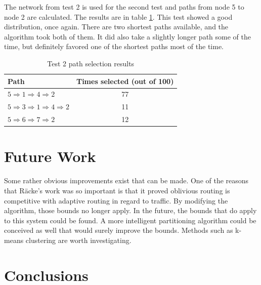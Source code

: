 The network from test 2 is used for the second test and paths from node 5 to node 2 are calculated. The results are in table \ref{tab:routing:test_2_paths}. This test showed a good distribution, once again. There are two shortest paths available, and the algorithm took both of them. It did also take a slightly longer path some of the time, but definitely favored one of the shortest paths most of the time.

\begin{table}
	\begin{center}
		\setlength{\extrarowheight}{1.5pt}
		\caption{Test 2 path selection results}
		\vspace{0.1cm}
		\begin{tabular} {|l|c|}
			\hline
			\textbf{Path} & \textbf{Times selected (out of 100)} \\
			\hline
			\hline
			$5\Rightarrow 1\Rightarrow 4\Rightarrow 2 $  & 77 \\
			\hline
			$5\Rightarrow 3\Rightarrow 1\Rightarrow 4\Rightarrow 2 $  & 11 \\
			\hline
			$5\Rightarrow 6\Rightarrow 7\Rightarrow 2 $  & 12 \\
			\hline
		\end{tabular}
		\label{tab:routing:test_2_paths}
	\end{center}
\end{table}

\section{Future Work}\label{sec:routing:future_work}

Some rather obvious improvements exist that can be made. One of the reasons that R\"acke's work was so important is that it proved oblivious routing is competitive with adaptive routing in regard to traffic. By modifying the algorithm, those bounds no longer apply. In the future, the bounds that do apply to this system could be found. A more intelligent partitioning algorithm could be conceived as well that would surely improve the bounds. Methods such as k-means clustering are worth investigating.

\section{Conclusions}\label{sec:routing:conclusions}

